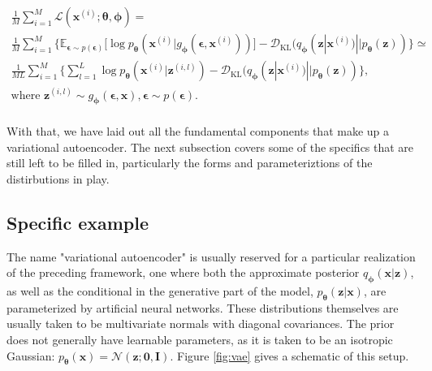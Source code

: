 \documentclass{report}
\begin{document}
\begin{equation}
\begin{gathered}
\frac{1}{M} \sum_{i=1}^M \mathcal{L}(\boldsymbol{x}^{(i)}; \boldsymbol{\theta}, \boldsymbol{\phi}) = \\
\frac{1}{M} \sum_{i=1}^M \Big\{ \mathbb{E}_{{\boldsymbol{\epsilon}} \sim p({\boldsymbol{\epsilon}})} \big[ \log p_{\boldsymbol{\theta}} (\boldsymbol{x}^{(i)} | g_{\boldsymbol{\phi}}(\boldsymbol{\epsilon}, \boldsymbol{x}^{(i)})) \big] - \mathcal{D}_{\text{KL}}(q_{\boldsymbol{\phi}}(\boldsymbol{z}|\boldsymbol{x}^{(i)}) || p_{\boldsymbol{\theta}}(\boldsymbol{z})) \Big\} \simeq \\
\frac{1}{ML} \sum_{i=1}^M \Big\{ \sum_{l=1}^L \log p_{\boldsymbol{\theta}} (\boldsymbol{x}^{(i)} | \boldsymbol{z}^{(i, l)}) - \mathcal{D}_{\text{KL}}(q_{\boldsymbol{\phi}}(\boldsymbol{z}|\boldsymbol{x}^{(i)}) || p_{\boldsymbol{\theta}}(\boldsymbol{z})) \Big\}, \\
\text{where } \boldsymbol{z}^{(i, l)} \sim g_{\boldsymbol{\phi}}(\boldsymbol{\epsilon}, \boldsymbol{x}), \boldsymbol{\epsilon} \sim p(\boldsymbol{\epsilon}).
\end{gathered}
\label{eq:vae-lb-reparam}
\end{equation} \\

\noindent With that, we have laid out all the fundamental components that make up a variational autoencoder. The next subsection covers some of the specifics that are still left to be filled in, particularly the forms and parameteriztions of the distirbutions in play.

\subsection{Specific example}

The name "variational autoencoder" is usually reserved for a particular realization of the preceding framework, one where both the approximate posterior $q_{\boldsymbol{\phi}}(\boldsymbol{x}|\boldsymbol{z})$, as well as the conditional in the generative part of the model, $p_{\boldsymbol{\theta}}(\boldsymbol{z} | \boldsymbol{x})$, are parameterized by artificial neural networks. These distributions themselves are usually taken to be multivariate normals with diagonal covariances. The prior does not generally have learnable parameters, as it is taken to be an isotropic Gaussian: $p_{\boldsymbol{\theta}}(\boldsymbol{x}) = \mathcal{N}(\boldsymbol{z}; \boldsymbol{0}, \boldsymbol{I})$. Figure \ref{fig:vae} gives a schematic of this setup. \\
\end{document}

